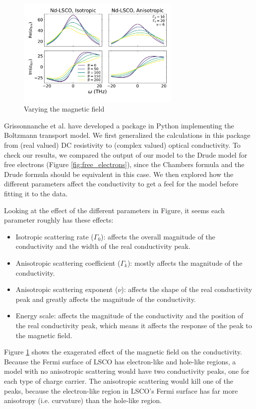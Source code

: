 \documentclass[12pt]{article}
\begin{document}
\begin{figure}
    \centering
    \includegraphics[width=0.7\textwidth]{figures/vary_field}
    \caption{Varying the magnetic field}
    \label{fig:vary_field}
\end{figure}

Grissonnanche et al. have developed a package in Python implementing the Boltzmann transport model.
We first generalized the calculations in this package from (real valued) DC resistivity to (complex
valued) optical conductivity. To check our results, we compared the output of our model to the Drude
model for free electrons (Figure \ref{fig:free_electrons}), since the Chambers formula and the Drude
formula should be equivalent in this case. We then explored how the different parameters affect the
conductivity to get a feel for the model before fitting it to the data.

Looking at the effect of the different parameters in Figure, it seems each parameter roughly has
these effects:
\begin{itemize}
    \item Isotropic scattering rate ($\Gamma_0$): affects the overall magnitude of the conductivity
        and the width of the real conductivity peak.
    \item Anisotropic scattering coefficient ($\Gamma_k$): mostly affects the magnitude of the
        conductivity.
    \item Anisotropic scattering exponent ($\nu$): affects the shape of the real conductivity peak
        and greatly affects the magnitude of the conductivity.
    \item Energy scale: affects the magnitude of the conductivity and the position of the real
        conductivity peak, which means it affects the response of the peak to the magnetic field.
\end{itemize}

Figure \ref{fig:vary_field} shows the exagerated effect of the magnetic field on the conductivity.
Because the Fermi surface of LSCO has electron-like and hole-like regions, a model with no
anisotropic scattering would have two conductivity peaks, one for each type of charge carrier. The
anisotropic scattering would kill one of the peaks, because the electron-like region in
LSCO's Fermi surface has far more anisotropy (i.e. curvature) than the hole-like region.
\end{document}
